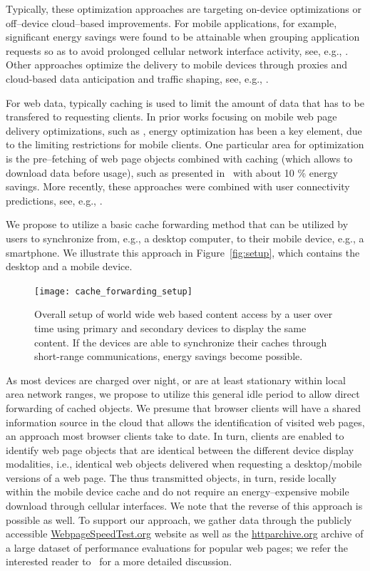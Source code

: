 \documentclass[letterpaper,conference]{IEEEtran}
\begin{document}
Typically, these optimization approaches are targeting on-device optimizations or off--device cloud--based improvements.
For mobile applications, for example, significant energy savings were found to be attainable when grouping application requests so as to avoid prolonged cellular network interface activity, see, e.g., \cite{BaBaVe09,QiWaGaHuGe12}.
Other approaches optimize the delivery to mobile devices through proxies and cloud-based data anticipation and traffic shaping, see, e.g., \cite{XiHuSaYl11}.

For web data, typically caching is used to limit the amount of data that has to be transfered to requesting clients.
In prior works focusing on mobile web page delivery optimizations, such as \cite{SaIs02}, energy optimization has been a key element, due to the limiting restrictions for mobile clients.
One particular area for optimization is the pre--fetching of web page objects combined with caching (which allows to download data before usage), such as presented in~\cite{ShKuDaWa05} with about 10 \% energy savings.
More recently, these approaches were combined with user connectivity predictions, see, e.g., \cite{ThChWo13}.

We propose to utilize a basic cache forwarding method that can be utilized by users to synchronize from, e.g., a desktop computer, to their mobile device, e.g., a smartphone.
We illustrate this approach in Figure~\ref{fig:setup}, which contains the desktop and a mobile device.

\begin{figure}
	\centering
	\texttt{[image: cache\_forwarding\_setup]}
	\caption{Overall setup of world wide web based content access by a user over time using primary and secondary devices to display the same content. If the devices are able to synchronize their caches through short-range communications, energy savings become possible.}
	\label{fig:cache_forwarding_setup}
\end{figure}

As most devices are charged over night, or are at least stationary within local area network ranges, we propose to utilize this general idle period to allow direct forwarding of cached objects.
We presume that browser clients will have a shared information source in the cloud that allows the identification of visited web pages, an approach most browser clients take to date.
In turn, clients are enabled to identify web page objects that are identical between the different device display modalities, i.e., identical web objects delivered when requesting a desktop/mobile versions of a web page.
The thus transmitted objects, in turn, reside locally within the mobile device cache and do not require an energy--expensive mobile download through cellular interfaces. 
We note that the reverse of this approach is possible as well.
To support our approach, we gather data through the publicly accessible \url{WebpageSpeedTest.org} website as well as the \url{httparchive.org} archive of a large dataset of performance evaluations for popular web pages; we refer the interested reader to~\cite{Me13} for a more detailed discussion.
\end{document}

